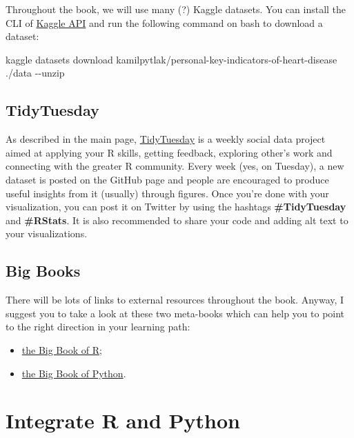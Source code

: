 \documentclass[
  letterpaper,
  DIV=11,
  numbers=noendperiod]{scrreprt}
\newenvironment{Shaded}{\begin{snugshade}}{\end{snugshade}}
\newcommand{\AttributeTok}[1]{\textcolor[rgb]{0.40,0.46,0.14}{#1}}
\newcommand{\ExtensionTok}[1]{\textcolor[rgb]{0.00,0.46,0.62}{#1}}
\newcommand{\NormalTok}[1]{\textcolor[rgb]{0.00,0.46,0.62}{#1}}
\providecommand{\tightlist}{%
  \setlength{\itemsep}{0pt}\setlength{\parskip}{0pt}}
\begin{document}
Throughout the book, we will use many (?) Kaggle datasets. You can
install the CLI of \href{https://www.kaggle.com/docs/api}{Kaggle API}
and run the following command on bash to download a dataset:

\begin{Shaded}
\begin{Highlighting}[]
\ExtensionTok{kaggle}\NormalTok{ datasets download kamilpytlak/personal{-}key{-}indicators{-}of{-}heart{-}disease ./data }\AttributeTok{{-}{-}unzip}
\end{Highlighting}
\end{Shaded}

\hypertarget{tidytuesday}{%
\subsection{TidyTuesday}\label{tidytuesday}}

As described in the main page,
\href{https://github.com/rfordatascience/tidytuesday}{TidyTuesday} is a
weekly social data project aimed at applying your R skills, getting
feedback, exploring other's work and connecting with the greater R
community. Every week (yes, on Tuesday), a new dataset is posted on the
GitHub page and people are encouraged to produce useful insights from it
(usually) through figures. Once you're done with your visualization, you
can post it on Twitter by using the hashtags \textbf{\#TidyTuesday} and
\textbf{\#RStats}. It is also recommended to share your code and adding
alt text to your visualizations.

\hypertarget{big-books}{%
\subsection{Big Books}\label{big-books}}

There will be lots of links to external resources throughout the book.
Anyway, I suggest you to take a look at these two meta-books which can
help you to point to the right direction in your learning path:

\begin{itemize}
\tightlist
\item
  \href{https://www.bigbookofr.com/}{the Big Book of R};
\item
  \href{https://www.bigbookofpython.com/}{the Big Book of Python}.
\end{itemize}

\hypertarget{integrate-r-and-python}{%
\section{Integrate R and Python}\label{integrate-r-and-python}}
\end{document}
